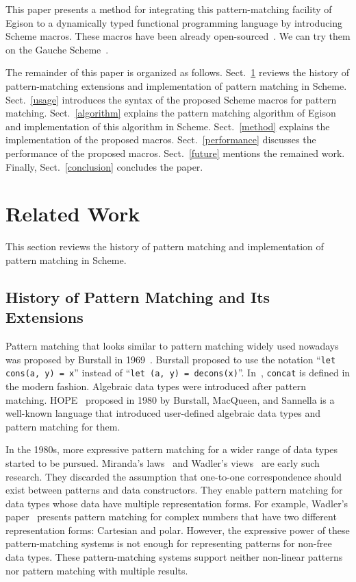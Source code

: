 \documentclass[acmlarge]{acmart}
\begin{document}
This paper presents a method for integrating this pattern-matching facility of Egison to a dynamically typed functional programming language by introducing Scheme macros.
These macros have been already open-sourced~\cite{egisonScheme}.
We can try them on the Gauche Scheme~\cite{gaucheWeb}.

The remainder of this paper is organized as follows.
Sect.~\ref{history} reviews the history of pattern-matching extensions and implementation of pattern matching in Scheme.
Sect.~\ref{usage} introduces the syntax of the proposed Scheme macros for pattern matching.
Sect.~\ref{algorithm} explains the pattern matching algorithm of Egison and implementation of this algorithm in Scheme.
Sect.~\ref{method} explains the implementation of the proposed macros.
Sect.~\ref{performance} discusses the performance of the proposed macros.
Sect.~\ref{future} mentions the remained work.
Finally, Sect.~\ref{conclusion} concludes the paper.

\section{Related Work}\label{history}

This section reviews the history of pattern matching and implementation of pattern matching in Scheme.

\subsection{History of Pattern Matching and Its Extensions}\label{history1}

Pattern matching that looks similar to pattern matching widely used nowadays was proposed by Burstall in 1969~\cite{burstall1969proving}.
Burstall proposed to use the notation ``\lstinline{let cons(a, y) = x}'' instead of ``\lstinline{let (a, y) = decons(x)}''.
In~\cite{burstall1969proving}, \lstinline{concat} is defined in the modern fashion.
Algebraic data types were introduced after pattern matching.
HOPE~\cite{burstall1980hope} proposed in 1980 by Burstall, MacQueen, and Sannella is a well-known language that introduced user-defined algebraic data types and pattern matching for them.

In the 1980s, more expressive pattern matching for a wider range of data types started to be pursued.
Miranda's laws~\cite{thompson1986laws,thompson1990lawful} and Wadler's views~\cite{wadler1987views} are early such research.
They discarded the assumption that one-to-one correspondence should exist between patterns and data constructors.
They enable pattern matching for data types whose data have multiple representation forms.
For example, Wadler's paper~\cite{wadler1987views} presents pattern matching for complex numbers that have two different representation forms: Cartesian and polar.
However, the expressive power of these pattern-matching systems is not enough for representing patterns for non-free data types.
These pattern-matching systems support neither non-linear patterns nor pattern matching with multiple results.
\end{document}
